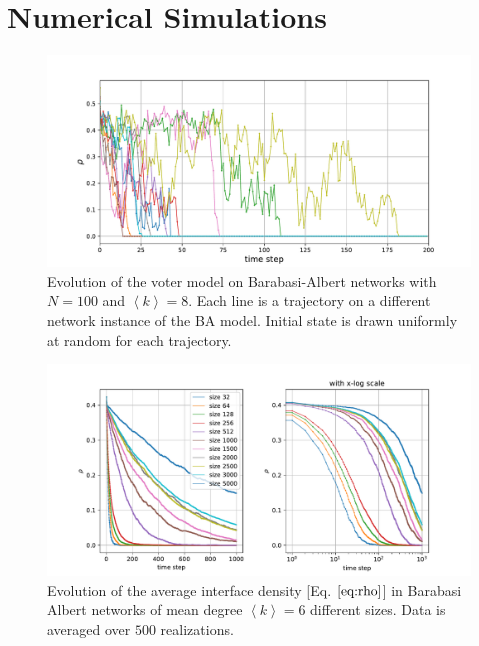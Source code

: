 \section{Numerical Simulations}
\begin{figure}[H]
    \centering
    \includegraphics[width=\linewidth]{latex_source/images/voter/example_evolution.pdf}
    \caption{Evolution of the voter model on Barabasi-Albert networks with $N=100$ and $\left\langle k\right\rangle = 8$. Each line is a trajectory on a different network instance of the BA model. Initial state is drawn uniformly at random for each trajectory.}
    \label{fig:enter-label}
\end{figure}

\begin{figure}[H]
    \centering
    \includegraphics[width=\linewidth]{latex_source/images/voter/BA_node_update_rule_results_logscale.pdf}
    \caption{Evolution of the average interface density [Eq. $\ref{eq:rho}$] in Barabasi Albert networks of mean degree $\left\langle k\right\rangle= 6$ different sizes. Data is averaged over $500$ realizations. }
    \label{fig:BA_evolution}
\end{figure}

